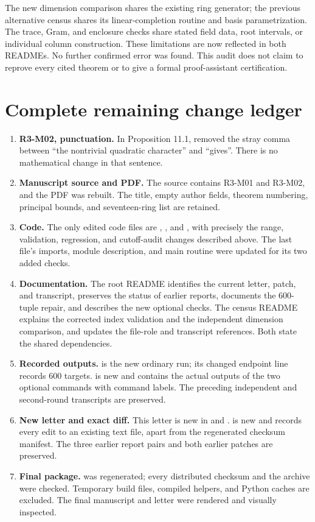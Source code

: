 \documentclass[11pt,a4paper]{article}
\begin{document}
The new dimension comparison shares the existing ring generator;
the previous alternative census shares its linear-completion routine
and basis parametrization. The trace, Gram, and enclosure checks
share stated field data, root intervals, or individual column
construction. These limitations are now reflected in both READMEs.
No further confirmed error was found. This audit does not claim to
reprove every cited theorem or to give a formal proof-assistant
certification.

\section{Complete remaining change ledger}

\begin{enumerate}
\item \textbf{R3-M02, punctuation.} In Proposition 11.1, removed
the stray comma between ``the nontrivial quadratic character'' and
``gives''. There is no mathematical change in that sentence.
\item \textbf{Manuscript source and PDF.} The source contains R3-M01
and R3-M02, and the PDF was rebuilt. The title, empty author fields,
theorem numbering, principal bounds, and seventeen-ring list are retained.
\item \textbf{Code.} The only edited code files are
,
, and
, with precisely the
range, validation, regression, and cutoff-audit changes described above.
The last file's imports, module description, and main routine were
updated for its two added checks.
\item \textbf{Documentation.} The root README identifies the current
letter, patch, and transcript, preserves the status of earlier reports,
documents the 600-tuple repair, and describes the new optional checks.
The census README explains the corrected index validation and the
independent dimension comparison, and updates the file-role and
transcript references. Both state the shared dependencies.
\item \textbf{Recorded outputs.}  is the new
ordinary run; its changed endpoint line records 600 targets.
 is new and contains the
actual outputs of the two optional commands with command labels.
The preceding independent and second-round transcripts are preserved.
\item \textbf{New letter and exact diff.} This letter is new in
 and
.
 is new and records every edit to an
existing text file, apart from the regenerated checksum manifest.
The three earlier report pairs and both earlier patches are preserved.
\item \textbf{Final package.}  was regenerated;
every distributed checksum and the archive were checked. Temporary
build files, compiled helpers, and Python caches are excluded. The
final manuscript and letter were rendered and visually inspected.
\end{enumerate}
\end{document}
